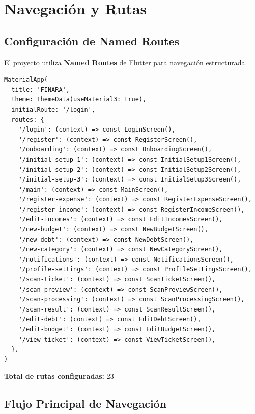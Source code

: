 \section{Navegación y Rutas}

\subsection{Configuración de Named Routes}

El proyecto utiliza \textbf{Named Routes} de Flutter \cite{flutter_navigation} para navegación estructurada.

\begin{lstlisting}[caption=Configuración en main.dart]
MaterialApp(
  title: 'FINARA',
  theme: ThemeData(useMaterial3: true),
  initialRoute: '/login',
  routes: {
    '/login': (context) => const LoginScreen(),
    '/register': (context) => const RegisterScreen(),
    '/onboarding': (context) => const OnboardingScreen(),
    '/initial-setup-1': (context) => const InitialSetup1Screen(),
    '/initial-setup-2': (context) => const InitialSetup2Screen(),
    '/initial-setup-3': (context) => const InitialSetup3Screen(),
    '/main': (context) => const MainScreen(),
    '/register-expense': (context) => const RegisterExpenseScreen(),
    '/register-income': (context) => const RegisterIncomeScreen(),
    '/edit-incomes': (context) => const EditIncomesScreen(),
    '/new-budget': (context) => const NewBudgetScreen(),
    '/new-debt': (context) => const NewDebtScreen(),
    '/new-category': (context) => const NewCategoryScreen(),
    '/notifications': (context) => const NotificationsScreen(),
    '/profile-settings': (context) => const ProfileSettingsScreen(),
    '/scan-ticket': (context) => const ScanTicketScreen(),
    '/scan-preview': (context) => const ScanPreviewScreen(),
    '/scan-processing': (context) => const ScanProcessingScreen(),
    '/scan-result': (context) => const ScanResultScreen(),
    '/edit-debt': (context) => const EditDebtScreen(),
    '/edit-budget': (context) => const EditBudgetScreen(),
    '/view-ticket': (context) => const ViewTicketScreen(),
  },
)
\end{lstlisting}

\textbf{Total de rutas configuradas:} 23

\subsection{Flujo Principal de Navegación}

